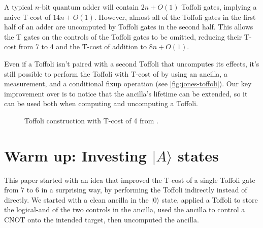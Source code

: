 \documentclass[twocolumn,longbibliography]{quantumarticle-customized}
\newcommand{\qH}{\gate{H}}
\newcommand{\qT}{\gate{T}}
\newcommand{\qTi}{\gate{T^\dagger}}
\newcommand{\qSi}{\gate{S^\dagger}}
\newcommand{\qO}{\lstick{|0\rangle}}
\begin{document}
A typical $n$-bit quantum adder will contain $2n + O(1)$ Toffoli gates, implying a naive T-cost of $14n + O(1)$.
However, almost all of the Toffoli gates in the first half of an adder are uncomputed by Toffoli gates in the second half.
This allows the T gates on the controls of the Toffoli gates to be omitted, reducing their T-cost from 7 to 4 and the T-cost of addition to $8n + O(1)$.

Even if a Toffoli isn't paired with a second Toffoli that uncomputes its effects, it's still possible to perform the Toffoli with T-cost of by using an ancilla, a measurement, and a conditional fixup operation \cite{Jones2013} (see \autoref{fig:jones-toffoli}).
Our key improvement over \cite{Jones2013} is to notice that the ancilla's lifetime can be extended, so it can be used both when computing and uncomputing a Toffoli.

\begin{figure}
  \resizebox{\linewidth}{!}{
    \Qcircuit @R=0.7em @C=0.7em {
      &\ctrl{1} &\qw & &   & & &     &\qw &\qw &\qw      &\qw  &\ctrl{3} &\qw &\qw      &\qw  &\qw &\qw  &\qw       &\qw &\qw    &\ctrl{1}       &\qw \\
      &\ctrl{1} &\qw & & = & & &     &\qw &\qw &\ctrl{2} &\qw  &\qw      &\qw &\ctrl{2} &\qw  &\qw &\qw  &\qw       &\qw &\qw    &\gate{Z}       &\qw \\
      &\targ    &\qw & &   & & &     &\qw &\qw &\qw      &\qw  &\qw      &\qw &\qw      &\qw  &\qw &\qw  &\targ     &\qw &\qw    &\qw\cwx        &\qw \\
      &         &    & &   & & & \qO &\qH &\qT &\targ    &\qTi &\targ    &\qT &\targ    &\qTi &\qH &\qSi &\ctrl{-1} &\qH &\meter &\cw\cwx\bullet & \\
    }
  }
  \caption{
	Toffoli construction with T-cost of 4 from \cite{Jones2013}.
  }
  \label{fig:jones-toffoli}
\end{figure}


\section{Warm up: Investing $|A\rangle$ states}
\label{sec:invest}

This paper started with an idea that improved the T-cost of a single Toffoli gate from 7 to 6 in a surprising way, by performing the Toffoli indirectly instead of directly.
We started with a clean ancilla in the $|0\rangle$ state, applied a Toffoli to store the logical-and of the two controls in the ancilla, used the ancilla to control a CNOT onto the intended target, then uncomputed the ancilla.
\end{document}
